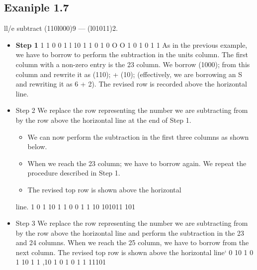 \documentclass[a4paper,12pt]{article}
\begin{document}
\subsection{Exaniple 1.7} ll/e subtract (110l000)9 — (l01011)2.
\begin{itemize}
    \item \textbf{Step 1}
1 1 0 0 1 l 10
1 1 0 1 0 O O
1 0 1 0 1 1
As in the previous example, we have to borrow to perform the subtraction in the units
column. The ﬁrst column with a non-zero entry is the 23 column. We borrow (1000); from
this column and rewrite it as (110); + (10); (effectively, we are borrowing an S and rewriting
it as 6 + 2). The revised row is recorded above the horizontal line.
\item Step 2 We replace the row representing the number we are subtracting from by the row above
the horizontal line at the end of Step 1. 

\begin{itemize}
    \item We can now perform the subtraction in the ﬁrst
three columns as shown below.
\item When we reach the 23 column; we have to borrow again. We
repeat the procedure described in Step 1.
\item The revised top row is shown above the horizontal
\end{itemize}

line.
1 0 1 10
1 1 0 0 1 1 10
101011
101
\item  Step 3 We replace the row representing the number we are subtracting from by the row above
the horizontal line and perform the subtraction in the 23 and 24 columns. When we reach
the 25 column, we have to borrow from the next column. The revised top row is shown above
the horizontal line‘
0 10
1 0 1 10 1 1 ,10
1 0 1 0 1 1
11101




\end{itemize}
\end{document}
